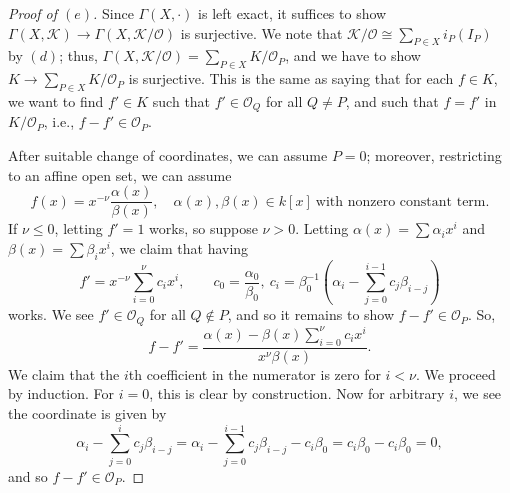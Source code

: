 \documentclass[12pt,letterpaper]{article}
\theoremstyle{definition}
\theoremstyle{remark}
\numberwithin{equation}{section}
\numberwithin{figure}{problem}
\newcommand{\OO}{\mathcal{O}}
\begin{document}
\begin{proof}[Proof of $(e)$]
  Since $\Gamma(X,\cdot)$ is left exact, it suffices to show $\Gamma(X,\mathscr{K}) \to \Gamma(X,\mathscr{K}/\mathscr{O})$ is surjective. We note that $\mathscr{K}/\mathscr{O} \cong \sum_{P \in X} i_P(I_P)$ by $(d)$; thus, $\Gamma(X,\mathscr{K}/\mathscr{O}) = \sum_{P \in X} K/\OO_P$, and we have to show $K \to \sum_{P \in X} K/\OO_P$ is surjective. This is the same as saying that for each $f \in K$, we want to find $f' \in K$ such that $f' \in \OO_Q$ for all $Q \ne P$, and such that $f = f'$ in $K/\OO_P$, i.e., $f - f' \in \OO_P$.
  \par After suitable change of coordinates, we can assume $P = 0$; moreover, restricting to an affine open set, we can assume
  \begin{equation*}
    f(x) = x^{-\nu} \frac{\alpha(x)}{\beta(x)}, \quad \alpha(x),\beta(x) \in k[x]~\text{with nonzero constant term}.
  \end{equation*}
  If $\nu \le 0$, letting $f' = 1$ works, so suppose $\nu > 0$. Letting $\alpha(x) = \sum \alpha_i x^i$ and $\beta(x) = \sum \beta_i x^i$, we claim that having
  \begin{equation*}
    f' = x^{-\nu}\sum_{i=0}^\nu c_ix^i, \qquad 
    c_0 = \frac{\alpha_0}{\beta_0},~c_i = \beta_0^{-1}\left(\alpha_i - \sum_{j=0}^{i-1} c_j\beta_{i-j}\right)
  \end{equation*}
  works. We see $f' \in \OO_Q$ for all $Q \notin P$, and so it remains to show $f - f' \in \OO_P$. So,
  \begin{equation*}
    f - f' = \frac{\alpha(x) - \beta(x)\sum_{i=0}^\nu c_ix^i}{x^\nu\beta(x)}.
  \end{equation*}
  We claim that the $i$th coefficient in the numerator is zero for $i < \nu$. We proceed by induction. For $i=0$, this is clear by construction. Now for arbitrary $i$, we see the coordinate is given by
  \begin{equation*}
    \alpha_i - \sum_{j=0}^i c_j\beta_{i-j} = \alpha_i - \sum_{j=0}^{i-1} c_j\beta_{i-j} - c_i\beta_0 = c_i\beta_0 - c_i\beta_0 = 0,
  \end{equation*}
  and so $f-f' \in \OO_P$.
\end{proof}
\end{document}
